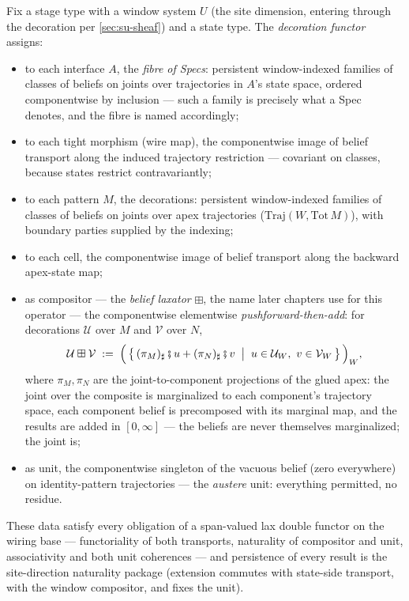 \begin{definition}
\label{def:su-house-functor}
Fix a stage type with a window system $U$ (the site dimension,
entering through the decoration per \autoref{sec:su-sheaf}) and
a state type. The \emph{decoration functor} assigns:
\begin{itemize}
\item to each interface $A$, the \emph{fibre of Specs}: persistent
  window-indexed families of classes of
  beliefs on joints over trajectories in $A$'s state
  space, ordered componentwise by inclusion --- such a family is
  precisely what a Spec denotes, and the fibre is named
  accordingly;
\item to each tight morphism (wire map), the componentwise image of
  belief transport along the induced trajectory restriction ---
  covariant on classes, because states restrict contravariantly;
\item to each pattern $M$, the decorations: persistent
  window-indexed families of classes of beliefs on
  joints over apex trajectories ($\mathrm{Traj}(W, \mathrm{Tot}\,
  M)$), with boundary parties supplied by the indexing;
\item to each cell, the componentwise image of belief transport
  along the backward apex-state map;
\item as compositor --- the \emph{belief laxator} $\boxplus$, the
  name later chapters use for this operator --- the componentwise
  elementwise
  \emph{pushforward-then-add}: for decorations $\mathcal{U}$ over
  $M$ and $\mathcal{V}$ over $N$,
  \[
    \mathcal{U} \boxplus \mathcal{V} \;:=\;
    \Bigl(\,\bigl\{\, (\pi_M)_{\sharp} \fatsemi u +
    (\pi_N)_{\sharp} \fatsemi v \;\bigm|\; u \in \mathcal{U}_W,\ v \in
    \mathcal{V}_W \,\bigr\}\,\Bigr)_{W},
  \]
  where $\pi_M, \pi_N$ are the joint-to-component projections of
  the glued apex: the joint over the composite is marginalized to
  each component's trajectory space, each component belief is
  precomposed with its marginal map, and the results are added in
  $[0,\infty]$ --- the beliefs are never themselves marginalized;
  the joint is;
\item as unit, the componentwise singleton of the vacuous belief
  (zero everywhere) on
  identity-pattern trajectories --- the \emph{austere} unit:
  everything permitted, no residue.
\end{itemize}
These data satisfy every obligation of a span-valued lax double
functor on the wiring base --- functoriality of both transports,
naturality of compositor and unit, associativity and both unit
coherences --- and persistence of every result is the site-direction
naturality package (extension commutes with state-side transport,
with the window compositor, and fixes the unit).
\end{definition}

